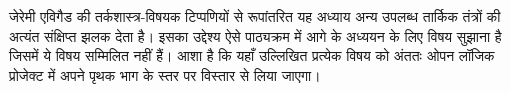 \documentclass[../../../include/open-logic-chapter]{subfiles}
\begin{document}

\begin{editorial}
  जेरेमी एविगैड की तर्कशास्त्र-विषयक टिप्पणियों से रूपांतरित यह अध्याय
  अन्य उपलब्ध तार्किक तंत्रों की अत्यंत संक्षिप्त झलक देता है। इसका
  उद्देश्य ऐसे पाठ्यक्रम में आगे के अध्ययन के लिए विषय सुझाना है जिसमें
  ये विषय सम्मिलित नहीं हैं। आशा है कि यहाँ उल्लिखित प्रत्येक विषय को
  अंततः ओपन लॉजिक प्रोजेक्ट में अपने पृथक भाग के स्तर पर विस्तार से लिया
  जाएगा।
\end{editorial}








\OLEndChapterHook
\end{document}
